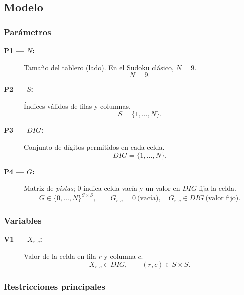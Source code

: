 
\subsection{Modelo}\label{sec:modelo}

\subsubsection*{Parámetros}

\begin{description}
  \item[\textbf{P1 — \(N\):}] Tamaño del tablero (lado). En el Sudoku clásico, \(N=9\).
  \[
    N = 9.
  \]

  \item[\textbf{P2 — \(S\):}] Índices válidos de filas y columnas.
  \[
    S = \{1,\dots,N\}.
  \]

  \item[\textbf{P3 — \(DIG\):}] Conjunto de dígitos permitidos en cada celda.
  \[
    DIG = \{1,\dots,N\}.
  \]

  \item[\textbf{P4 — \(G\):}] Matriz de \emph{pistas}; \(0\) indica celda vacía y un valor en \(DIG\) fija la celda.
  \[
    G \in \{0,\dots,N\}^{S\times S}, \qquad
    G_{r,c}=0 \ \text{(vacía)},\quad G_{r,c}\in DIG \ \text{(valor fijo)}.
  \]
\end{description}

\subsubsection*{Variables}

\begin{description}
  \item[\textbf{V1 — \(X_{r,c}\):}] Valor de la celda en fila \(r\) y columna \(c\).
  \[
    X_{r,c}\in DIG, \qquad (r,c)\in S\times S.
  \]
\end{description}

\subsubsection*{Restricciones principales}

